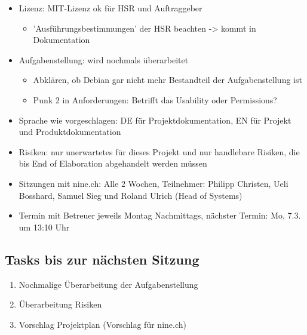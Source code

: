 \documentclass[class=scrbook,crop=false]{standalone}
\begin{document}
	\begin{itemize}
		\item Lizenz: MIT-Lizenz ok für HSR und Auftraggeber
		\begin{itemize}
		    \item 'Ausführungsbestimmungen' der HSR beachten -> kommt in Dokumentation
	    \end{itemize}
		\item Aufgabenstellung: wird nochmals überarbeitet
		\begin{itemize}
		    \item Abklären, ob Debian gar nicht mehr Bestandteil der Aufgabenstellung ist
		    \item Punk 2 in Anforderungen: Betrifft das Usability oder Permissions?
	    \end{itemize}
		\item Sprache wie vorgeschlagen: DE für Projektdokumentation, EN für Projekt und Produktdokumentation
		\item Risiken: nur unerwartetes für dieses Projekt und nur handlebare Risiken, die bis End of Elaboration abgehandelt werden müssen
		\item Sitzungen mit nine.ch: Alle 2 Wochen, Teilnehmer: Philipp Christen, Ueli Bosshard, Samuel Sieg und Roland Ulrich (Head of Systems)
		\item Termin mit Betreuer jeweils Montag Nachmittags, nächster Termin: Mo, 7.3. um 13:10 Uhr
	\end{itemize}
	
    \subsection*{Tasks bis zur nächsten Sitzung}
    
    \begin{enumerate}
        \item Nochmalige Überarbeitung der Aufgabenstellung
        \item Überarbeitung Risiken
        \item Vorschlag Projektplan (Vorschlag für nine.ch)
    \end{enumerate}
\end{document}
